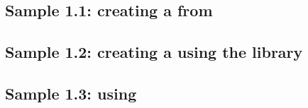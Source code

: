 
\subsection{Sample 1.1: creating a \gdcase{} from \gdsteps{}}
\label{samplesteststeps}


\subsection{Sample 1.2: creating a \gdcase{} using the library}
\label{sampleslibrary}


%

\subsection{Sample 1.3: using \gdehandlers{}}



